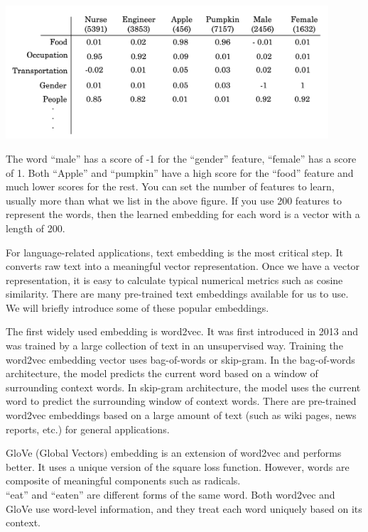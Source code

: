 \documentclass[12pt,]{krantz}
\begin{document}
\includegraphics[width=0.9\textwidth,height=\textheight]{images/rnn_embedding1.png}

The word ``male'' has a score of -1 for the ``gender'' feature, ``female'' has a score of 1. Both ``Apple'' and ``pumpkin'' have a high score for the ``food'' feature and much lower scores for the rest. You can set the number of features to learn, usually more than what we list in the above figure. If you use 200 features to represent the words, then the learned embedding for each word is a vector with a length of 200.

For language-related applications, text embedding is the most critical step. It converts raw text into a meaningful vector representation. Once we have a vector representation, it is easy to calculate typical numerical metrics such as cosine similarity. There are many pre-trained text embeddings available for us to use. We will briefly introduce some of these popular embeddings.

The first widely used embedding is word2vec. It was first introduced in 2013 and was trained by a large collection of text in an unsupervised way. Training the word2vec embedding vector uses bag-of-words or skip-gram. In the bag-of-words architecture, the model predicts the current word based on a window of surrounding context words. In skip-gram architecture, the model uses the current word to predict the surrounding window of context words. There are pre-trained word2vec embeddings based on a large amount of text (such as wiki pages, news reports, etc.) for general applications.

GloVe (Global Vectors) embedding is an extension of word2vec and performs better. It uses a unique version of the square loss function. However, words are composite of meaningful components such as radicals.\\
``eat'' and ``eaten'' are different forms of the same word. Both word2vec and GloVe use word-level information, and they treat each word uniquely based on its context.
\end{document}
